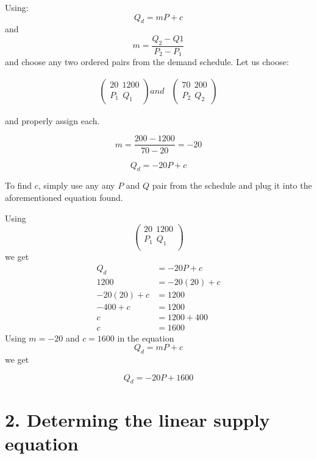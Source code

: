 \documentclass[table]{article}
\begin{document}
    Using: $$Q_{d} = mP+c$$ and $$m = \frac{Q_{2}-Q{1}}{P_{2}-P_{1}}$$ and choose any two ordered pairs from the demand schedule.
    Let us choose:

    $$
        \begin{aligned}
            \begin{pmatrix}
                20 \ \ 1200 \\
                P_1 \ \ Q_1
            \end{pmatrix} and &
            \begin{pmatrix}
                70 \ \ 200 \\
                P_2 \ \ Q_2
            \end{pmatrix}
        \end{aligned}
    $$

    and properly assign each.

    $$m = \frac{200-1200}{70-20} = -20$$

    $$
        Q_d = -20P + c
    $$

    To find $c$, simply use any any $P$ and $Q$ pair from the schedule and plug it into the aforementioned equation found.

    Using
    $$
        \begin{pmatrix}
            20 \ \ 1200 \\
            P_1 \ \ Q_1 \\
        \end{pmatrix}
    $$
    we get
    $$
        \begin{aligned}
            Q_d         & = -20P + c   \\
            1200        & = -20(20)+c  \\
            -20(20) + c & = 1200       \\
            -400 + c    & = 1200       \\
            c           & = 1200 + 400 \\
            c           & = 1600
        \end{aligned}
    $$
    Using $m=-20$ and $c=1600$ in the equation
    $$
        Q_d = mP + c
    $$
    we get

    $$
        Q_d = -20P + 1600
    $$

    \section*{2. Determing the linear supply equation}
\end{document}
